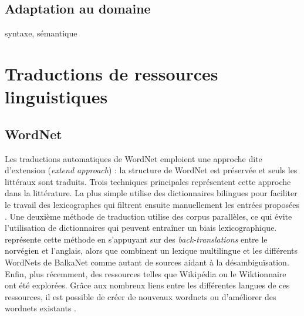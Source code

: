 
\subsection{Adaptation au domaine}

syntaxe, sémantique

\section{Traductions de ressources linguistiques}

\subsection{WordNet}

Les traductions automatiques de WordNet emploient une approche dite d'extension
(\textit{extend approach}) : la structure de WordNet est préservée et seuls les
littéraux sont traduits. Trois techniques principales représentent cette
approche dans la littérature. La plus simple utilise des dictionnaires
bilingues pour faciliter le travail des lexicographes qui filtrent ensuite
manuellement les entrées proposées
\citep{vossen1998eurowordnet,pianta2002developing,tufis2004balkanet}. Une
deuxième méthode de traduction utilise des corpus parallèles, ce qui évite
l'utilisation de dictionnaires qui peuvent entraîner un biais lexicographique.
\cite{dyvik2004translations} représente cette méthode en s'appuyant sur des
\textit{back-translations} entre le norvégien et l'anglais, alors que
\citep{sagot2008construction} combinent un lexique multilingue et les
différents WordNets de BalkaNet comme autant de sources aidant à la
désambiguïsation. Enfin, plus récemment, des ressources telles que Wikipédia ou
le Wiktionnaire ont été explorées. Grâce aux nombreux liens entre les
différentes langues de ces ressources, il est possible de créer de nouveaux
wordnets \citep{demelo2009towards,navigli2010babelnet} ou d'améliorer des
wordnets existants \citep{hanoka2012wordnet}.

